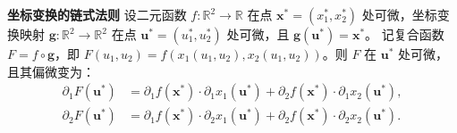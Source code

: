 \documentclass[12pt,UTF8]{ctexbook}
\begin{document}

\begin{tm}{\textbf{坐标变换的链式法则}}
设二元函数 $f: \mathbb{R}^2 \to \mathbb{R}$ 在点 $\mathbf{x}^* = (x_1^*, x_2^*)$ 处可微，坐标变换映射 $\mathbf{g}: \mathbb{R}^2 \to \mathbb{R}^2$ 在点 $\mathbf{u}^* = (u_1^*, u_2^*)$ 处可微，且 $\mathbf{g}(\mathbf{u}^*) = \mathbf{x}^*$。
记复合函数 $F = f \circ \mathbf{g}$，即 $F(u_1, u_2) = f(x_1(u_1, u_2), x_2(u_1, u_2))$。则 $F$ 在 $\mathbf{u}^*$ 处可微，且其偏微变为：
\begin{align*}
\partial_1 F(\mathbf{u}^*) &= \partial_1 f(\mathbf{x}^*) \cdot \partial_1 x_1(\mathbf{u}^*) + \partial_2 f(\mathbf{x}^*) \cdot \partial_1 x_2(\mathbf{u}^*), \\
\partial_2 F(\mathbf{u}^*) &= \partial_1 f(\mathbf{x}^*) \cdot \partial_2 x_1(\mathbf{u}^*) + \partial_2 f(\mathbf{x}^*) \cdot \partial_2 x_2(\mathbf{u}^*).
\end{align*}
\end{tm}
\end{document}
